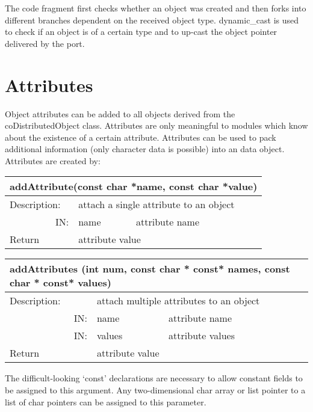 The code fragment first checks whether an object was created and then forks 
into different branches dependent on the received object type. dynamic\_cast
is used to check if an object is of a certain type and to up-cast the 
object pointer delivered by the port.

\section{Attributes}

Object attributes can be added to all objects derived from the coDistributedObject 
class. Attributes are only meaningful to modules which know about the
existence of a certain attribute. Attributes can be used to pack additional 
information (only character data is possible) into an data object.  Attributes
are created by:


\begin{longtable}{|p{4cm}|p{2.5cm}|p{7cm}|}
\hline
\multicolumn{3}{|p{13.5cm}|}{\bf addAttribute(const char *name, const char *value)} \\
\hline
{Description:}  
           & \multicolumn{2}{p{9.5cm}|}{attach a single attribute to an object} \\
\hline
\multicolumn{1}{|r|}{IN:} & {name} 
                          & {attribute name}\\
\hline
{Return}  & \multicolumn{2}{p{9.5cm}|}{attribute value} \endhead
\hline
\end{longtable}

\begin{longtable}{|p{4cm}|p{2.5cm}|p{7cm}|}
\hline
\multicolumn{3}{|p{13.5cm}|}{\bf addAttributes (int num,\newline
           const char * const* names, const char * const* values)}\\
\hline
{Description:}  
           & \multicolumn{2}{p{9.5cm}|}{attach multiple attributes to an object} \\
\hline
\multicolumn{1}{|r|}{IN:} & {name} 
                          & {attribute name}\\
\hline
\multicolumn{1}{|r|}{IN:} & {values} 
                          & {attribute values}\\
\hline
{Return}  & \multicolumn{2}{p{9.5cm}|}{attribute value} \endhead
\hline
\end{longtable}

The difficult-looking `const' declarations are necessary to allow constant 
fields to be assigned to this argument. Any two-dimensional char array or
list pointer to a list of char pointers can be assigned to this parameter. 

